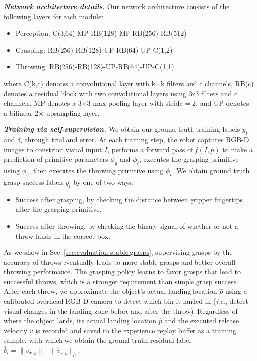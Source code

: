 \documentclass[journal]{IEEEtran}
\newcommand{\ie}{\textit{i}.\textit{e}., }
\newcommand{\mypara}[1]{\par\vspace*{0.8mm}\noindent\textbf{\textit{#1}}}
\begin{document}
\mypara{Network architecture details.} Our network architecture consists of the following layers for each module:
\begin{itemize}
\item Perception: C(3,64)-MP-RB(128)-MP-RB(256)-RB(512)
\item Grasping: RB(256)-RB(128)-UP-RB(64)-UP-C(1,2)
\item Throwing: RB(256)-RB(128)-UP-RB(64)-UP-C(1,1)
\end{itemize}
where C(k,c) denotes a convolutional layer with k$\times$k filters and c channels, RB(c) denotes a residual block \cite{he2016deep} with two convolutional layers using 3x3 filters and c channels, MP denotes a 3$\times$3 max pooling layer with stride = 2, and UP denotes a bilinear 2$\times$ upsampling layer.

\mypara{Training via self-supervision.} We obtain our ground truth training labels $y_i$ and $\bar{\delta}_i$ through trial and error. At each training step, the robot captures RGB-D images to construct visual input $I$, performs a forward pass of $f(I,p)$ to make a prediction of primitive parameters $\phi_g$ and $\phi_t$, executes the grasping primitive using $\phi_g$, then executes the throwing primitive using $\phi_t$. 
We obtain ground truth grasp success labels $y_i$ by one of two ways:
%
\begin{itemize}[noitemsep]
\item[1.] Success after grasping, by checking the distance between gripper fingertips after the grasping primitive.
%
\item[2.] Success after throwing, by checking the binary signal of whether or not a throw lands in the correct box.
\end{itemize}
%
As we show in Sec. \ref{sec:evaluation-stable-grasps}, supervising grasps by the accuracy of throws eventually leads to more stable grasps and better overall throwing performance. The grasping policy learns to favor grasps that lead to successful throws, which is a stronger requirement than simple grasp success. 
After each throw, we approximate the object's actual landing location $\hat{p}$ using a calibrated overhead RGB-D camera to detect which bin it landed in (\ie detect visual changes in the landing zone before and after the throw). 
Regardless of where the object lands, its actual landing location $\hat{p}$ and the executed release velocity $v$ is recorded and saved to the experience replay buffer as a training sample, with which we obtain the ground truth residual label $\bar{\delta}_{i}=\|v_{x,y}\|-\|\hat{v}_{x,y}\|_{\hat{p}}$.
\end{document}
